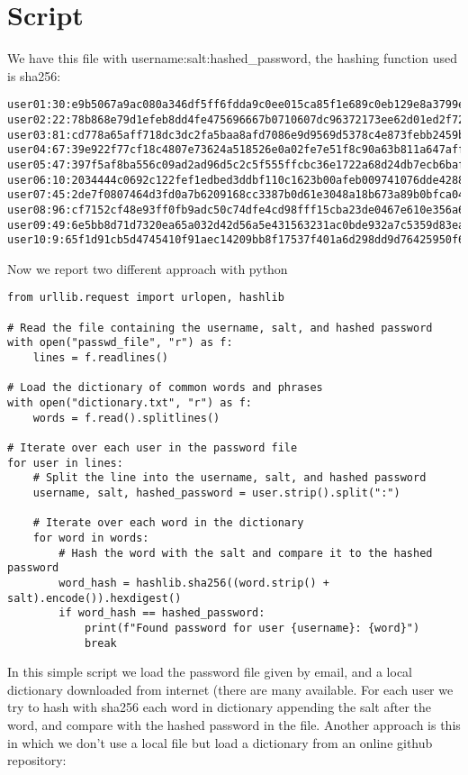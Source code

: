 \documentclass{article}
\begin{document}
\section{Script}
We have this file with username:salt:hashed\_password, the hashing function used is sha256:
\begin{lstlisting}
user01:30:e9b5067a9ac080a346df5ff6fdda9c0ee015ca85f1e689c0eb129e8a3799e1a7
user02:22:78b868e79d1efeb8dd4fe475696667b0710607dc96372173ee62d01ed2f721d1
user03:81:cd778a65aff718dc3dc2fa5baa8afd7086e9d9569d5378c4e873febb2459b86c
user04:67:39e922f77cf18c4807e73624a518526e0a02fe7e51f8c90a63b811a647aff621
user05:47:397f5af8ba556c09ad2ad96d5c2c5f555ffcbc36e1722a68d24db7ecb6baf92c
user06:10:2034444c0692c122fef1edbed3ddbf110c1623b00afeb009741076dde4288368
user07:45:2de7f0807464d3fd0a7b6209168cc3387b0d61e3048a18b673a89b0bfca04968
user08:96:cf7152cf48e93ff0fb9adc50c74dfe4cd98fff15cba23de0467e610e356a6d2b
user09:49:6e5bb8d71d7320ea65a032d42d56a5e431563231ac0bde932a7c5359d83eace4
user10:9:65f1d91cb5d4745410f91aec14209bb8f17537f401a6d298dd9d76425950f616
\end{lstlisting}
Now we report two different approach with python
\begin{lstlisting}
from urllib.request import urlopen, hashlib

# Read the file containing the username, salt, and hashed password
with open("passwd_file", "r") as f:
    lines = f.readlines()

# Load the dictionary of common words and phrases
with open("dictionary.txt", "r") as f:
    words = f.read().splitlines()

# Iterate over each user in the password file
for user in lines:
    # Split the line into the username, salt, and hashed password
    username, salt, hashed_password = user.strip().split(":")

    # Iterate over each word in the dictionary
    for word in words:
        # Hash the word with the salt and compare it to the hashed password
        word_hash = hashlib.sha256((word.strip() + salt).encode()).hexdigest()
        if word_hash == hashed_password:
            print(f"Found password for user {username}: {word}")
            break
\end{lstlisting}
In this simple script we load the password file given by email, and a local dictionary downloaded from internet (there are many available. For each user we try to hash with sha256 each word in dictionary appending the salt after the word, and compare with the hashed password in the file. Another approach is this in which we don't use a local file but load a dictionary from an online github repository:
\end{document}
